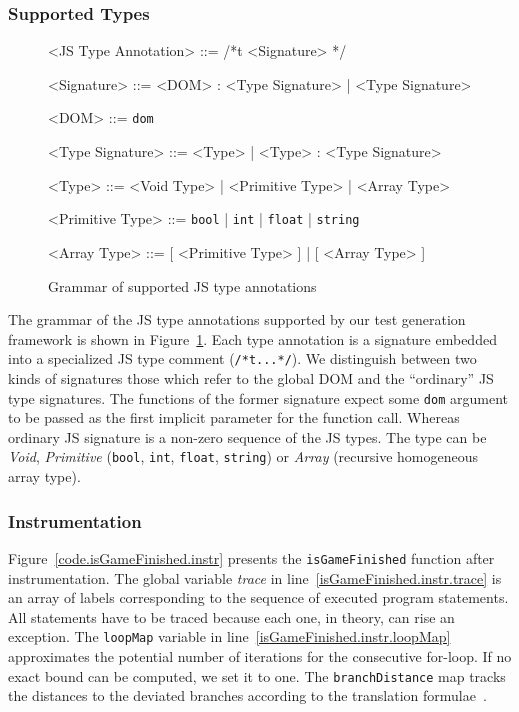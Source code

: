 \documentclass[sigconf,review, anonymous]{acmart}
\begin{document}
\subsubsection{Supported Types}
\label{sub.sec.sup.types}

\begin{figure}[t]
\setlength{\grammarparsep}{3pt}
\small
\begin{grammar}

<JS Type Annotation> ::= /*t <Signature> */

<Signature> ::= <DOM> : <Type Signature> | <Type Signature>

<DOM> ::= \texttt{dom}

<Type Signature> ::= <Type> | <Type> : <Type Signature>

<Type> ::= <Void Type> | <Primitive Type> | <Array Type>

<Primitive Type> ::= \texttt{bool} | \texttt{int} | \texttt{float} | \texttt{string}

<Array Type> ::= [ <Primitive Type> ] | [ <Array Type> ]
\end{grammar}
\caption{Grammar of supported JS type annotations}
\label{fig.js.type.annot}
\end{figure}

The grammar of the JS type annotations supported by our test generation framework is shown in Figure~\ref{fig.js.type.annot}. Each type annotation is a signature embedded into a specialized JS type comment (\texttt{/*t...*/}). We distinguish between two kinds of signatures those which refer to the global DOM and the ``ordinary'' JS type signatures. The functions of the former signature expect some \texttt{dom} argument to be passed as the first implicit parameter for the function call. Whereas ordinary JS signature is a non-zero sequence of the JS types. The type can be \emph{Void}, \emph{Primitive} (\texttt{bool}, \texttt{int}, \texttt{float}, \texttt{string}) or \emph{Array} (recursive homogeneous array type).  

\subsubsection{Instrumentation}
\label{sub.sec.instrument}

Figure~\ref{code.isGameFinished.instr} presents the \texttt{isGameFinished} function after instrumentation. The global variable \emph{trace} in line~\ref{isGameFinished.instr.trace} is an array of labels corresponding to the sequence of executed program statements. All statements have to be traced because each one, in theory, can rise an exception. The \texttt{loopMap} variable in line~\ref{isGameFinished.instr.loopMap} approximates the potential number of iterations for the consecutive for-loop. If no exact bound can be computed, we set it to one. The \texttt{branchDistance} map tracks the distances to the deviated branches according to the translation formulae~\cite{tracey1998automated}.  
\end{document}
